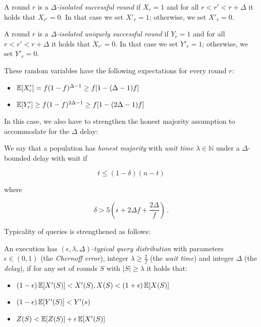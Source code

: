\begin{definition}
A round $r$ is a \emph{$\Delta$-isolated successful round} if $X_r = 1$
and for all $r < r' < r + \Delta$ it holds that $X_{r'} = 0$. In that case we
set $X'_r = 1$; otherwise, we set $X'_r = 0$.

A round $r$ is a \emph{$\Delta$-isolated uniquely successful round} if $Y_r = 1$
and for all $r < r' < r + \Delta$ it holds that $X_{r'} = 0$. In that case we
set $Y'_r = 1$; otherwise, we set $Y'_r = 0$.
\end{definition}

These random variables have the following expectations for every round $r$:

\begin{itemize}
  \item $\operatorname{\mathbb{E}}[X'_r] = f(1 - f)^{\Delta - 1} \geq f[1 - (\Delta - 1)f]$
  \item $\operatorname{\mathbb{E}}[Y'_r] \geq f(1 - f)^{2\Delta - 1} \geq f[1 - (2\Delta - 1)f]$
\end{itemize}

In this case, we also have to strengthen the honest majority assumption to
accommodate for the $\Delta$ delay:

\begin{definition}
  We say that a population has \emph{honest majority} with \emph{wait time}
  $\lambda \in \mathbb{N}$ under a $\Delta$-bounded delay with wait if

  \[
  t \leq (1 - \delta)(n - t)
  \]

  where

  \[
  \delta > 5(\epsilon + 2\Delta f + \frac{2 \Delta}{f})\,.
  \]
\end{definition}

Typicality of queries is strengthened as follows:

\begin{definition}
  An execution has \emph{$(\epsilon, \lambda, \Delta)$-typical query
  distribution} with parameters $\epsilon \in (0, 1)$ (the \emph{Chernoff
  error}), integer $\lambda \geq \frac{2}{f}$ (the \emph{wait time}) and integer
  $\Delta$ (the \emph{delay}), if for any set of rounds $S$ with $|S| \geq
  \lambda$ it holds that:

  \begin{itemize}
    \item $(1 - \epsilon)\operatorname{\mathbb{E}}[X'(S)] < X'(S), X(S) < (1 + \epsilon)\operatorname{\mathbb{E}}[X(S)]$
    \item $(1 - \epsilon)\operatorname{\mathbb{E}}[Y'(S)] < Y'(s)$
    \item $Z(S) < \operatorname{\mathbb{E}}[Z(S)] + \epsilon \operatorname{\mathbb{E}}[X'(S)]$
  \end{itemize}
\end{definition}

